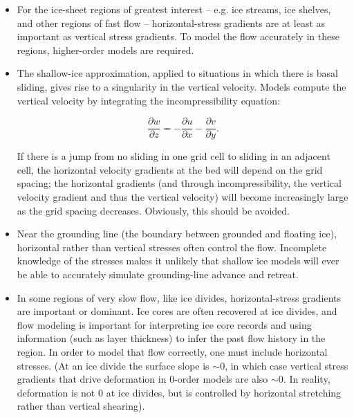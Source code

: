 \begin{itemize}
\item For the ice-sheet regions of greatest interest -- e.g. ice streams, ice shelves, and other regions of fast flow -- horizontal-stress gradients are at least as important as vertical stress gradients. To model the flow accurately in these regions, higher-order models are required.

\item The shallow-ice approximation, applied to situations in which there is basal sliding, gives rise to a singularity in the vertical velocity. Models compute the vertical velocity by integrating the incompressibility equation:

\begin{equation}
  \label{ho.eq.incompress}
  \frac{\partial w}{\partial z} = -\frac{\partial u}{\partial x}-\frac{\partial v}{\partial y}.
\end{equation}

If there is a jump 
from no sliding in one grid cell to sliding in an adjacent cell, the horizontal velocity gradients at the bed will depend on the grid spacing; the horizontal gradients (and through incompressibility, the vertical velocity gradient and thus the vertical velocity) will become increasingly large as the grid spacing decreases. Obviously, this should be avoided.

\item Near the grounding line (the boundary between grounded and floating ice), horizontal rather than vertical stresses often control the flow. Incomplete knowledge of the stresses makes it unlikely that shallow ice models will ever be able to accurately simulate grounding-line advance and retreat.

\item In some regions of very slow flow, like ice divides, horizontal-stress gradients are important or dominant. Ice cores are often recovered at ice divides, and flow modeling is important for interpreting ice core records and using information (such as layer thickness) to infer the past flow history in the region. In order to model that flow correctly, one must include horizontal stresses. (At an ice divide the surface slope is \(\sim\)0, in which case vertical stress gradients that drive deformation in 0-order models are also \(\sim\)0. In reality, deformation is not 0 at ice divides, but is controlled by horizontal stretching rather than vertical shearing).
\end{itemize}

